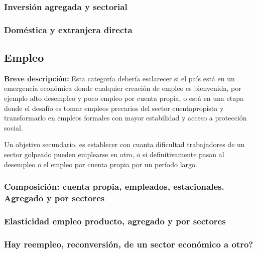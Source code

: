\documentclass[12pt,a4paper]{article}
\begin{document}
\subsubsection{Inversión agregada y sectorial}


\subsubsection{Doméstica y extranjera directa}





\vspace{0.5cm}

\subsection{Empleo}

\textbf{Breve descripción:} \newline
Esta categoría debería esclarecer si el país está en un emergencia económica donde cualquier creación de empleo es bienvenida, por ejemplo alto desempleo y poco empleo por cuenta propia, o está en una etapa donde el desafío es tomar empleos precarios del sector cuentapropista y transformarlo en empleos formales con mayor estabilidad y acceso a protección social.

Un objetivo secundario, es establecer con cuanta dificultad trabajadores de un sector golpeado pueden emplearse en otro, o si definitivamente pasan al desempleo o el empleo por cuenta propia por un período largo.


\subsubsection{Composición: cuenta propia, empleados, estacionales. Agregado y por sectores}

\subsubsection{Elasticidad empleo producto, agregado y por sectores}

\subsubsection{Hay reempleo, reconversión, de un sector económico a otro?}
\end{document}
